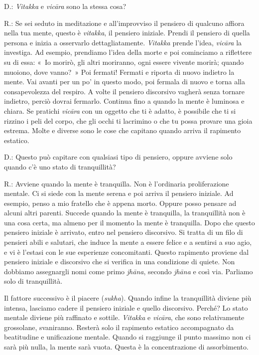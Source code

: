 D.: \emph{Vitakka} e \emph{vicāra} sono la stessa cosa?

R.: Se sei seduto in meditazione e all'improvviso il pensiero di
qualcuno affiora nella tua mente, questo è \emph{vitakka}, il pensiero
iniziale. Prendi il pensiero di quella persona e inizia a osservarlo
dettagliatamente. \emph{Vitakka} prende l'idea, \emph{vicāra} la
investiga. Ad esempio, prendiamo l'idea della morte e poi cominciamo a
riflettere su di essa: «~Io morirò, gli altri moriranno, ogni essere
vivente morirà; quando muoiono, dove vanno?~» Poi fermati! Fermati e
riporta di nuovo indietro la mente. Vai avanti per un po' in questo
modo, poi fermala di nuovo e torna alla consapevolezza del respiro. A
volte il pensiero discorsivo vagherà senza tornare indietro, perciò
dovrai fermarlo. Continua fino a quando la mente è luminosa e chiara. Se
pratichi \emph{vicāra} con un oggetto che ti è adatto, è possibile che
ti si rizzino i peli del corpo, che gli occhi ti lacrimino o che tu
possa provare una gioia estrema. Molte e diverse sono le cose che
capitano quando arriva il rapimento estatico.

D.: Questo può capitare con qualsiasi tipo di pensiero, oppure avviene
solo quando c'è uno stato di tranquillità?

R.: Avviene quando la mente è tranquilla. Non è l'ordinaria
proliferazione mentale. Ci si siede con la mente serena e poi arriva il
pensiero iniziale. Ad esempio, penso a mio fratello che è appena morto.
Oppure posso pensare ad alcuni altri parenti. Succede quando la mente è
tranquilla, la tranquillità non è una cosa certa, ma almeno per il
momento la mente è tranquilla. Dopo che questo pensiero iniziale è
arrivato, entro nel pensiero discorsivo. Si tratta di un filo di
pensieri abili e salutari, che induce la mente a essere felice e a
sentirsi a suo agio, e vi è l'estasi con le sue esperienze concomitanti.
Questo rapimento proviene dal pensiero iniziale e discorsivo che si
verifica in una condizione di quiete. Non dobbiamo assegnargli nomi come
primo \emph{jhāna}, secondo \emph{jhāna} e così via. Parliamo solo di
tranquillità.

Il fattore successivo è il piacere (\emph{sukha}). Quando infine la
tranquillità diviene più intensa, lasciamo cadere il pensiero iniziale e
quello discorsivo. Perché? Lo stato mentale diviene più raffinato e
sottile. \emph{Vitakka} e \emph{vicāra}, che sono relativamente
grossolane, svaniranno. Resterà solo il rapimento estatico accompagnato
da beatitudine e unificazione mentale. Quando si raggiunge il punto
massimo non ci sarà più nulla, la mente sarà vuota. Questa è la
concentrazione di assorbimento.

